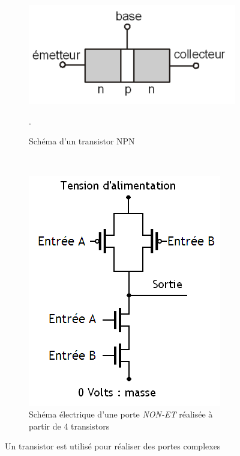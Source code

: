     \begin{figure}[htbp]
        \centering
        \begin{subfigure}[b]{0.45\linewidth}\centering
            \includegraphics[width=\linewidth]{images/transistor.png}
            \caption{\label{pic:transistor} Schéma d'un transistor NPN \cite{GeraldHuguenin2018}}.
        \end{subfigure}
        ~ %
        \begin{subfigure}[b]{0.45\linewidth}\centering
            \includegraphics[width=0.5\linewidth]{images/processeur_porte_nand.png}
            \caption{\label{pic:processeur_porte_nand} Schéma électrique d'une porte \textit{NON-ET} réalisée à partir de 4 transistors \cite{Wikibooks2019PorteNand}}
        \end{subfigure}
        \caption{Un transistor est utilisé pour réaliser des portes complexes  }\label{pic:transistor_usage}
    \end{figure}




